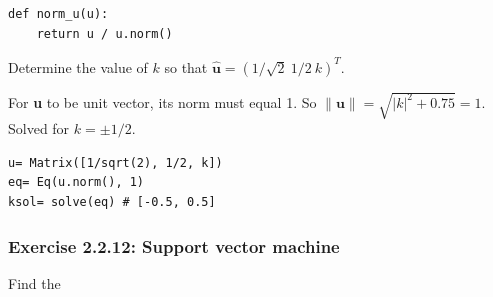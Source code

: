 \begin{verbatim}
def norm_u(u):
    return u / u.norm()
\end{verbatim}

Determine the value of $k$ so that $\mathbf{\hat{u}} = (1/\sqrt{2}\ 1/2\ k)^T$.

For \textbf{u} to be unit vector, its norm must equal 1. So $\mathbf{\|u\|} = \sqrt{\left\lvert{k}\right\rvert^{2} + 0.75} = 1$.
Solved for $k= \pm 1/2$.

\begin{verbatim}
u= Matrix([1/sqrt(2), 1/2, k])
eq= Eq(u.norm(), 1)
ksol= solve(eq) # [-0.5, 0.5]
\end{verbatim}

\subsubsection{Exercise 2.2.12: Support vector machine}

Find the 



